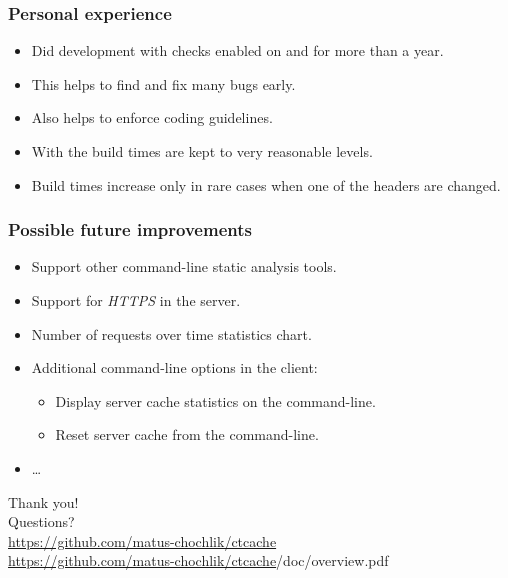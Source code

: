 \documentclass[compress,table,xcolor=table]{beamer}
\begin{document}
\begin{frame}
  \frametitle{Personal experience}
    \Large
    \begin{itemize}
    \item Did development with  checks enabled on
         and  for more than a year.
    \item This helps to find and fix many bugs early.
    \item Also helps to enforce coding guidelines.
    \item With  the build times are kept
        to very reasonable levels.
    \item Build times increase only in rare cases when one of the 
        headers are changed.
    \end{itemize}
\end{frame}
\begin{frame}
  \frametitle{Possible future improvements}
    \LARGE
    \begin{itemize}
    \item Support other command-line static analysis tools.
    \item Support for {\em HTTPS} in the server.
    \item Number of requests over time statistics chart.
    \item Additional command-line options in the client:
    \begin{itemize}
    \item Display server cache statistics on the command-line.
    \item Reset server cache from the command-line.
    \end{itemize}
    \item \ldots
    \end{itemize}
\end{frame}
\begin{frame}
  \centering
  \Huge
  Thank you!\\Questions?\\
  \vfill
  \Large
  \url{https://github.com/matus-chochlik/ctcache}\\
  \vfill
  \large
  \url{https://github.com/matus-chochlik/ctcache}/doc/overview.pdf
\end{frame}
\end{document}
